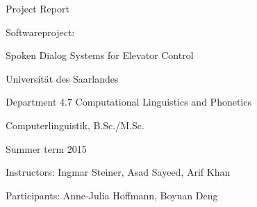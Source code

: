 
\begin{center} Project Report \end{center}
\hspace{1cm}
\begin{center} Softwareproject: \end{center}
\begin{center}Spoken Dialog Systems for Elevator Control \end{center}
\begin{center} Universität des Saarlandes \end{center}
\begin{center} Department 4.7 Computational Linguistics and Phonetics \end{center}
\begin{center} Computerlinguistik, B.Sc./M.Sc. \end{center}
\begin{center} Summer term 2015 \end{center} 

\hspace{1cm}
\begin{center}Instructors: Ingmar Steiner, Asad Sayeed, Arif Khan \end{center}

\begin{center} Participants: Anne-Julia Hoffmann, Boyuan Deng \end{center}

